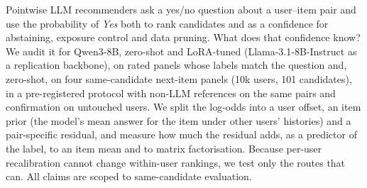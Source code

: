 Pointwise LLM recommenders ask a yes/no question about a user--item pair and use the probability of \emph{Yes} both to rank
candidates and as a confidence for abstaining, exposure control and data pruning. What does that confidence know? We audit it
for Qwen3-8B, zero-shot and LoRA-tuned (Llama-3.1-8B-Instruct as a replication backbone), on rated panels whose labels match the
question and, zero-shot, on four same-candidate next-item panels (10k users, 101 candidates), in a pre-registered protocol with
non-LLM references on the same pairs and confirmation on untouched users. We split the log-odds into a user offset, an item prior
(the model's mean answer for the item under other users' histories) and a pair-specific residual, and measure how much the
residual adds, as a predictor of the label, to an item mean and to matrix factorisation.
Because per-user recalibration cannot change within-user rankings, we test only the routes that can. All claims are scoped to
same-candidate evaluation.

